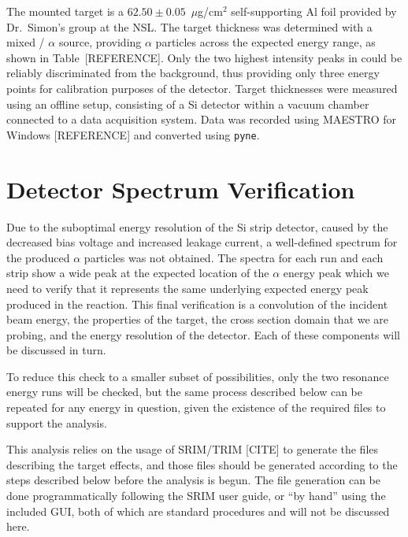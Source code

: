 

The mounted target is a $62.50\pm0.05$~$\mu$g/cm$^2$ self-supporting Al
foil provided by Dr.\ Simon's group at the NSL. The target thickness was
determined with a mixed / $\alpha$ source,
providing $\alpha$ particles across the expected energy range, as shown
in Table~[REFERENCE]. Only the two highest intensity peaks in
 could be reliably discriminated from the background, thus
providing only three energy points for calibration purposes of the
detector. Target thicknesses were measured using an offline setup,
consisting of a Si detector within a vacuum chamber connected to a data
acquisition system. Data was recorded using MAESTRO for Windows
[REFERENCE] and converted using \texttt{pyne}.




\section{Detector Spectrum
Verification}\label{detector-spectrum-verification}

Due to the suboptimal energy resolution of the Si strip detector, caused
by the decreased bias voltage and increased leakage current, a
well-defined spectrum for the produced $\alpha$ particles was not
obtained. The spectra for each run and each strip show a wide peak at
the expected location of the $\alpha$ energy peak which we need to
verify that it represents the same underlying expected energy peak
produced in the reaction. This final verification is a convolution of
the incident beam energy, the properties of the target, the cross
section domain that we are probing, and the energy resolution of the
detector. Each of these components will be discussed in turn.

To reduce this check to a smaller subset of possibilities, only the two
resonance energy runs will be checked, but the same process described
below can be repeated for any energy in question, given the existence of
the required files to support the analysis.

This analysis relies on the usage of SRIM/TRIM [CITE] to generate the
files describing the target effects, and those files should be generated
according to the steps described below before the analysis is begun. The
file generation can be done programmatically following the SRIM user
guide, or ``by hand'' using the included GUI, both of which are standard
procedures and will not be discussed here.


